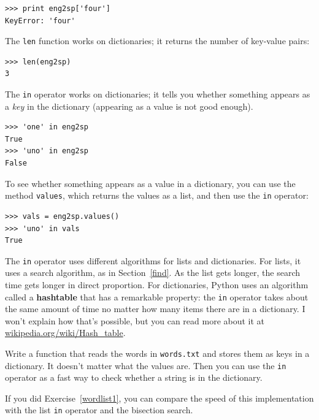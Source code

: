 \documentclass[10pt]{book}
\begin{document}

\beforeverb
\begin{verbatim}
>>> print eng2sp['four']
KeyError: 'four'
\end{verbatim}
\afterverb
%
The {\tt len} function works on dictionaries; it returns the
number of key-value pairs:


\beforeverb
\begin{verbatim}
>>> len(eng2sp)
3
\end{verbatim}
\afterverb
%
The {\tt in} operator works on dictionaries; it tells you whether
something appears as a {\em key} in the dictionary (appearing
as a value is not good enough).


\beforeverb
\begin{verbatim}
>>> 'one' in eng2sp
True
>>> 'uno' in eng2sp
False
\end{verbatim}
\afterverb
%
To see whether something appears as a value in a dictionary, you
can use the method {\tt values}, which returns the values as
a list, and then use the {\tt in} operator:


\beforeverb
\begin{verbatim}
>>> vals = eng2sp.values()
>>> 'uno' in vals
True
\end{verbatim}
\afterverb
%
The {\tt in} operator uses different algorithms for lists and
dictionaries.  For lists, it uses a search algorithm, as in
Section~\ref{find}.  As the list gets longer, the search time gets
longer in direct proportion.  For dictionaries, Python uses an
algorithm called a {\bf hashtable} that has a remarkable property: the
{\tt in} operator takes about the same amount of time no matter how
many items there are in a dictionary.  I won't explain how that's
possible, but you can read more about it at
\url{wikipedia.org/wiki/Hash_table}.


\begin{ex}
\label{wordlist2}


Write a function that reads the words in {\tt words.txt} and
stores them as keys in a dictionary.  It doesn't matter what the
values are.  Then you can use the {\tt in} operator
as a fast way to check whether a string is in
the dictionary.

If you did Exercise~\ref{wordlist1}, you can compare the speed
of this implementation with the list {\tt in} operator and the
bisection search.

\end{ex}
\end{document}

